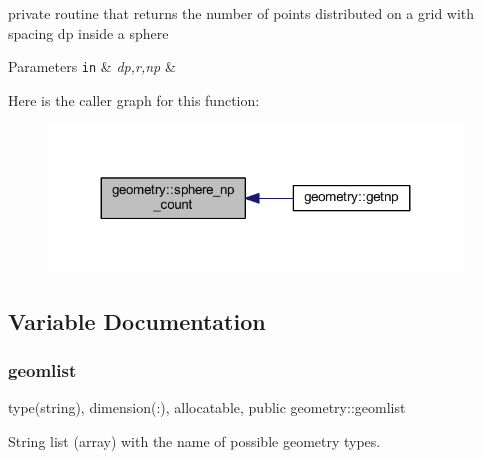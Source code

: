 private routine that returns the number of points distributed on a grid with spacing dp inside a sphere 
\begin{DoxyParams}[1]{Parameters}
\mbox{\tt in}  & {\em dp,r,np} & \\
\hline
\end{DoxyParams}
Here is the caller graph for this function\+:\nopagebreak
\begin{figure}[H]
\begin{center}
\leavevmode
\includegraphics[width=311pt]{namespacegeometry_a4f070ef95bffe3bbb21bd251ae5ca6c7_icgraph}
\end{center}
\end{figure}


\subsection{Variable Documentation}
\mbox{\label{namespacegeometry_a879bd9ccab6fc42f051bbfc9f0560a62}} 
\subsubsection{\texorpdfstring{geomlist}{geomlist}}
{\footnotesize\ttfamily type(string), dimension(\+:), allocatable, public geometry\+::geomlist}



String list (array) with the name of possible geometry types. 


